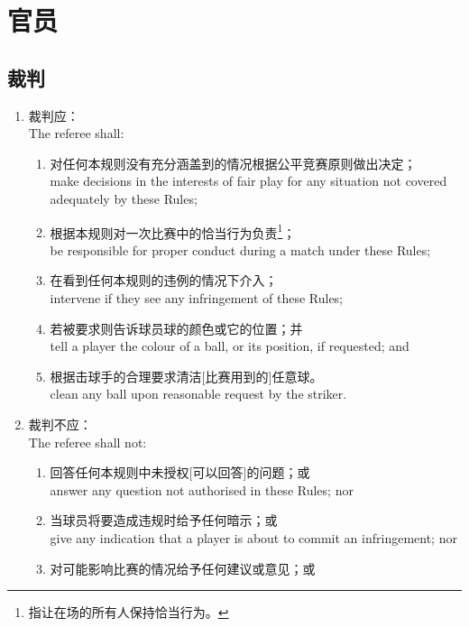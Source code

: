 \section{官员}\label{225}

\subsection{裁判}\label{2251}

\begin{enumerate}[label=(\alph*)]
    \item \label{2251a}裁判应：\\
    The referee shall:
    \begin{enumerate}[label=(\roman*)]
        \item \label{2251ai}对任何本规则没有充分涵盖到的情况根据公平竞赛原则做出决定；\\
        make decisions in the interests of fair play for any situation not covered adequately by these Rules;
        \item 根据本规则对一次比赛中的恰当行为负责\footnote{指让在场的所有人保持恰当行为。}；\\
        be responsible for proper conduct during a match under these Rules;
        \item 在看到任何本规则的违例的情况下介入；\\
        intervene if they see any infringement of these Rules;
        \item 若被要求则告诉球员球的颜色或它的位置；并\\
        tell a player the colour of a ball, or its position, if requested; and
        \item 根据击球手的合理要求清洁[比赛用到的]任意球。\\
        clean any ball upon reasonable request by the striker.
    \end{enumerate}
    \item 裁判不应：\\
    The referee shall not:
    \begin{enumerate}[label=(\roman*)]
        \item 回答任何本规则中未授权[可以回答]的问题；或\\
        answer any question not authorised in these Rules; nor
        \item 当球员将要造成违规时给予任何暗示；或\\
        give any indication that a player is about to commit an infringement; nor
        \item 对可能影响比赛的情况给予任何建议或意见；或\\

\end{enumerate}
\end{enumerate}
